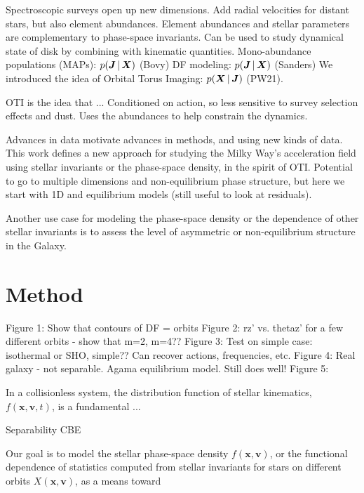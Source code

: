 Spectroscopic surveys open up new dimensions.
Add radial velocities for distant stars, but also element abundances.
Element abundances and stellar parameters are complementary to phase-space invariants.
Can be used to study dynamical state of disk by combining with kinematic quantities.
Mono-abundance populations (MAPs): $p(\boldsymbol{J} \,|\, \boldsymbol{X})$ (Bovy)
DF modeling: $p(\boldsymbol{J} \,|\, \boldsymbol{X})$ (Sanders)
We introduced the idea of Orbital Torus Imaging: $p(\boldsymbol{X} \,|\, \boldsymbol{J})$ (PW21).

OTI is the idea that ...
Conditioned on action, so less sensitive to survey selection effects and dust.
Uses the abundances to help constrain the dynamics.

Advances in data motivate advances in methods, and using new kinds of data.
This work defines a new approach for studying the Milky Way's acceleration field using
stellar invariants or the phase-space density, in the spirit of OTI.
Potential to go to multiple dimensions and non-equilibrium phase structure, but here we
start with 1D and equilibrium models (still useful to look at residuals).

Another use case for modeling the phase-space density or the dependence of other stellar
invariants is to assess the level of asymmetric or non-equilibrium structure in the
Galaxy.


\section{Method} \label{sec:method}


Figure 1: Show that contours of DF = orbits
Figure 2: rz' vs. thetaz' for a few different orbits - show that m=2, m=4??
Figure 3: Test on simple case: isothermal or SHO, simple?? Can recover actions, frequencies, etc.
Figure 4: Real galaxy - not separable. Agama equilibrium model. Still does well!
Figure 5:



In a collisionless system, the distribution function of stellar kinematics,
$f(\boldsymbol{x}, \boldsymbol{v}, t)$, is a fundamental ...

Separability
CBE

Our goal is to model the stellar phase-space density
$f(\boldsymbol{x}, \boldsymbol{v})$, or the functional dependence of statistics computed
from stellar invariants for stars on different orbits $X(\boldsymbol{x},
\boldsymbol{v})$, as a means toward

